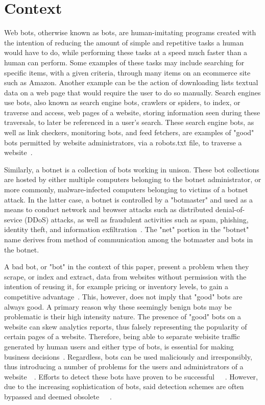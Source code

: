 
\section{Context}\label{sec:context}
Web bots, otherwise known as bots, are human-imitating programs created with the intention of reducing the amount of simple and repetitive tasks a human would have to do, while performing these tasks at a speed much faster than a human can perform.
Some examples of these tasks may include searching for specific items, with a given criteria, through many items on an ecommerce site such as Amazon.
Another example can be the action of downloading lists textual data on a web page that would require the user to do so manually.
Search engines use bots, also known as search engine bots, crawlers or spiders, to index, or traverse and access, web pages of a website, storing information seen during these traversals, to later be referenced in a user's search.
These search engine bots, as well as link checkers, monitoring bots, and feed fetchers, are examples of "good" bots permitted by website administrators, via a robots.txt file, to traverse a website~\cite{ROVETTA2020102577}.

Similarly, a botnet is a collection of bots working in unison.
These bot collections are hosted by either multiple computers belonging to the botnet administrator, or more commonly, malware-infected computers belonging to victims of a botnet attack.
In the latter case, a botnet is controlled by a "botmaster" and used as a means to conduct network and browser attacks such as distributed denial-of-sevice (DDoS) attacks, as well as fraudulent activities such as spam, phishing, identity theft, and information exfiltration~\cite{inproceedings}.
The "net" portion in the "botnet" name derives from method of communication among the botmaster and bots in the botnet.

A bad bot, or "bot" in the context of this paper, present a problem when they scrape, or index and extract, data from websites without permission with the intention of reusing it, for example pricing or inventory levels, to gain a competitive advantage~\cite{bad_bot_report}.
This, however, does not imply that "good" bots are always good.
A primary reason why these seemingly benign bots may be problematic is their high intensity nature.
The presence of "good" bots on a website can skew analytics reports, thus falsely representing the popularity of certain pages of a website.
Therefore, being able to separate webisite traffic generated by human users and either type of bots, is essential for making business decisions~\cite{bad_bot_report}.
Regardless, bots can be used maliciously and irresponsibly, thus introducing a number of problems for the users and administrators of a website~\cite{1ee426975c3d46d2ba6ef5c2d76384c5}~\cite{bad_bot_report}.
Efforts to detect these bots have proven to be successful~\cite{akamai_bot_detection}~\cite{Hamidzadeh2018}~\cite{ZABIHIMAYVAN2017129}.
However, due to the increasing sophistication of bots, said detection schemes are often bypassed and deemed obsolete~\cite{ROVETTA2020102577}~\cite{STEVANOVIC2013698}~\cite{10.1109/DSN.2013.6575366}.

